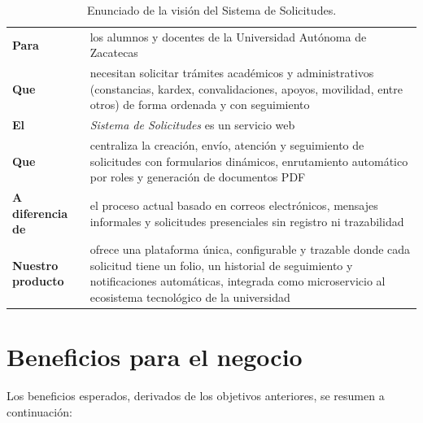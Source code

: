\documentclass[12pt,letterpaper]{report}
\begin{document}
\begin{table}[H]
\centering
\renewcommand{\arraystretch}{1.5}
\begin{tabular}{|l p{10cm}|}
    \hline
    \textbf{Para} & los alumnos y docentes de la Universidad Autónoma de Zacatecas \\
    \textbf{Que} & necesitan solicitar trámites académicos y administrativos (constancias, kardex, convalidaciones, apoyos, movilidad, entre otros) de forma ordenada y con seguimiento \\
    \textbf{El} & \textit{Sistema de Solicitudes} es un servicio web \\
    \textbf{Que} & centraliza la creación, envío, atención y seguimiento de solicitudes con formularios dinámicos, enrutamiento automático por roles y generación de documentos PDF \\
    \textbf{A diferencia de} & el proceso actual basado en correos electrónicos, mensajes informales y solicitudes presenciales sin registro ni trazabilidad \\
    \textbf{Nuestro producto} & ofrece una plataforma única, configurable y trazable donde cada solicitud tiene un folio, un historial de seguimiento y notificaciones automáticas, integrada como microservicio al ecosistema tecnológico de la universidad \\
    \hline
\end{tabular}
\caption{Enunciado de la visión del Sistema de Solicitudes.}
\label{tab:vision}
\end{table}

\section{Beneficios para el negocio}

Los beneficios esperados, derivados de los objetivos anteriores, se resumen a continuación:
\end{document}
